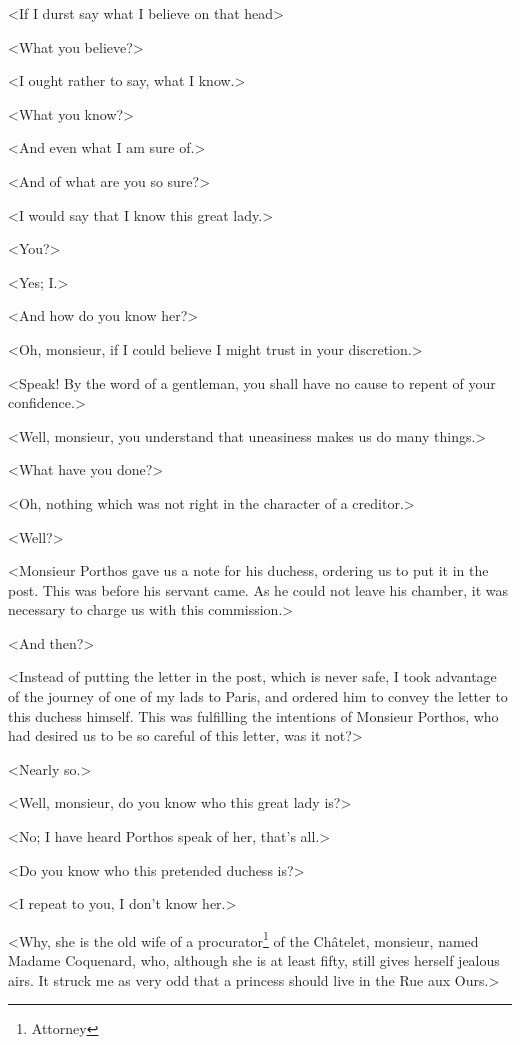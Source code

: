 <If I durst say what I believe on that head\longdash> 

<What you believe?> 

<I ought rather to say, what I know.> 

<What you know?> 

<And even what I am sure of.> 

<And of what are you so sure?> 

<I would say that I know this great lady.> 

<You?> 

<Yes; I.> 

<And how do you know her?> 

<Oh, monsieur, if I could believe I might trust in your discretion.> 

<Speak! By the word of a gentleman, you shall have no cause to repent of your confidence.> 

<Well, monsieur, you understand that uneasiness makes us do many things.> 

<What have you done?> 

<Oh, nothing which was not right in the character of a creditor.> 

<Well?> 

<Monsieur Porthos gave us a note for his duchess, ordering us to put it in the post. This was before his servant came. As he could not leave his chamber, it was necessary to charge us with this commission.> 

<And then?> 

<Instead of putting the letter in the post, which is never safe, I took advantage of the journey of one of my lads to Paris, and ordered him to convey the letter to this duchess himself. This was fulfilling the intentions of Monsieur Porthos, who had desired us to be so careful of this letter, was it not?> 

<Nearly so.> 

<Well, monsieur, do you know who this great lady is?> 

<No; I have heard Porthos speak of her, that's all.> 

<Do you know who this pretended duchess is?>

<I repeat to you, I don't know her.> 

<Why, she is the old wife of a procurator\footnote{Attorney} of the Châtelet, monsieur, named Madame Coquenard, who, although she is at least fifty, still gives herself jealous airs. It struck me as very odd that a princess should live in the Rue aux Ours.>  

